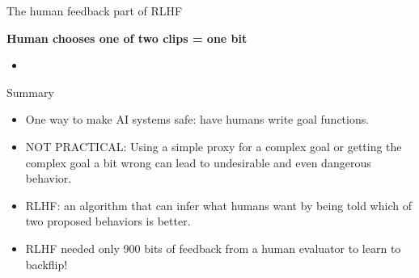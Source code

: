 \begin{vbframe}{The human feedback part of RLHF}

\vfill

\textbf{Human chooses one of two clips = one bit}

	\begin{itemize}
		\item \href{https://player.vimeo.com/video/754042470?h=e64a40690d&badge=0&autopause=0&player_id=0&app_id=58479}{}

	\end{itemize}

\vfill

\end{vbframe}



\begin{vbframe}{Summary}

\vfill

\textbf{}

	\begin{itemize}
		\item One way to make  AI
		systems safe: have humans 
		write goal functions.
		\item NOT PRACTICAL: Using a simple
		proxy for a complex goal or getting the
		complex goal a bit wrong can lead to
		undesirable and even dangerous behavior.
                \item
		RLHF: an algorithm that can infer
		what humans want by being told which of two
		proposed behaviors is better.
\item RLHF needed only 900 bits of feedback from a human
		evaluator to learn to backflip!
	\end{itemize}

\vfill

\end{vbframe}


